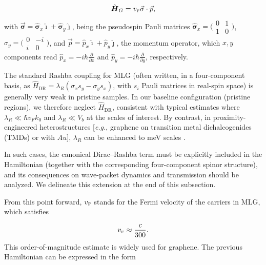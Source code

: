 \begin{equation}
    \label{eq:pristGr}
    \hat{\mbox{\boldmath $H$}}_G = v_{\mbox{\tiny F}}\vec{\mathbf{\sigma}}\cdot\vec{p},
\end{equation}
\noindent with $\vec{\mathbf{\sigma}} = \hat{\mathbf{\sigma}}_{x}\hat{\imath} + \hat{\mathbf{\sigma}}_{y}\hat{\jmath}$, being the pseudospin Pauli matrices $\hat{\mathbf{\sigma}}_{x} = \bigl(\begin{smallmatrix}
0&1 \\ 1&0
\end{smallmatrix} \bigr)$, $\hat{\sigma}_{y} = \bigl(\begin{smallmatrix}
                                                         0&-i \\ i&0
\end{smallmatrix} \bigr)$, and $\vec{p}=\hat{p}_{x}\hat{\imath}+\hat{p}_{y}\hat{\jmath}$, the momentum operator, which $x, y$ components read $\hat{p}_{x} = -i\hbar\frac{\partial}{\partial x}$ and $\hat{p}_{y} = -i\hbar\frac{\partial}{\partial y}$, respectively.

The standard Rashba coupling for MLG (often written, in a four-component basis, as $\hat{H}_{\mathrm{DR}}=\lambda_R(\sigma_x s_y-\sigma_y s_x)$, with $s_i$ Pauli matrices in real-spin space) is generally very weak in pristine samples. In our baseline configuration (pristine regions), we therefore neglect $\hat{H}_{\mathrm{DR}}$, consistent with typical estimates where $\lambda_R \ll \hbar v_F k_0$ and $\lambda_R \ll V_b$ at the scales of interest. By contrast, in proximity-engineered heterostructures [\textit{e.g.}, graphene on transition metal dichalcogenides (TMDs) or with $Au$], $\lambda_R$ can be enhanced to meV scales \cite{AvsarNatCommun2014, WangPhysRevX2016}.

In such cases, the canonical Dirac--Rashba term must be explicitly included in the Hamiltonian (together with the corresponding four-component spinor structure), and its consequences on wave-packet dynamics and transmission should be analyzed. We delineate this extension at the end of this subsection.

From this point forward, $v_{\mbox{\tiny F}}$ stands for the Fermi velocity of the carriers in MLG, which satisfies

\begin{equation}
    \label{eq:vF}
    v_{\mbox{\tiny F}} \approx \frac{c}{300}.
\end{equation}
This order-of-magnitude estimate is widely used for graphene\cite{Geimk2007}. The previous Hamiltonian can be expressed in the form 

